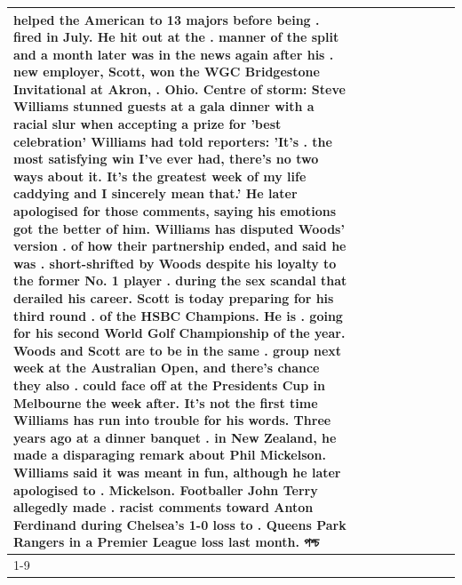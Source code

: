 \begin{table}[H]
\begin{tabular}{lllrlllll}
helped the American to 13 majors before being . fired in July. He hit out at the . manner of the split and a month later was in the news again after his . new employer, Scott, won the WGC Bridgestone Invitational at Akron, . Ohio. Centre of storm: Steve Williams stunned guests at a gala dinner with a racial slur when accepting a prize for 'best celebration' Williams had told reporters: 'It's . the most satisfying win I've ever had, there's no two ways about it. It's the greatest week of my life caddying and I sincerely mean that.' He later apologised for those comments, saying his emotions got the better of him. Williams has disputed Woods' version . of how their partnership ended, and said he was . short-shrifted by Woods despite his loyalty to the former No. 1 player . during the sex scandal that derailed his career. Scott is today preparing for his third round . of the HSBC Champions. He is . going for his second World Golf Championship of the year. Woods and Scott are to be in the same . group next week at the Australian Open, and there's chance they also . could face off at the Presidents Cup in Melbourne the week after. It's not the first time Williams has run into trouble for his words. Three years ago at a dinner banquet . in New Zealand, he made a disparaging remark about Phil Mickelson. Williams said it was meant in fun, although he later apologised to . Mickelson. Footballer John Terry allegedly made . racist comments toward Anton Ferdinand during Chelsea's 1-0 loss to . Queens Park Rangers in a Premier League loss last month. পশ্চ \\
\cline{1-9}

\end{tabular}
\end{table}
